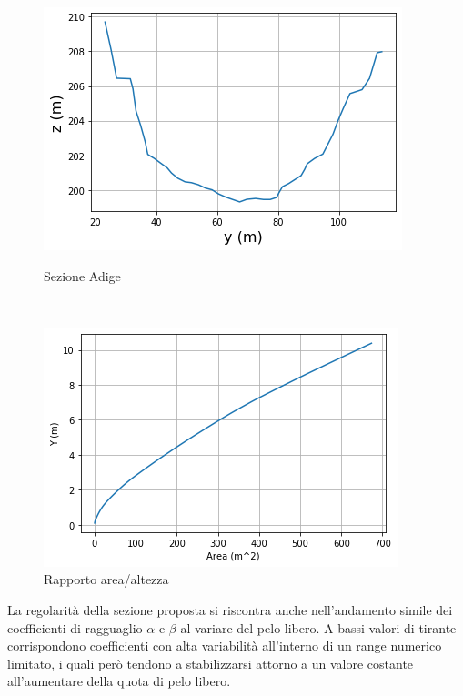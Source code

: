 \documentclass[12pt]{article} %
\begin{document}
\begin{figure}[H]
\begin{minipage}[b]{8.5cm}
\centering
    \includegraphics[width=1 \textwidth]{sezioneadi.png}
    \caption{Sezione Adige}
    \label{fig:Adige_sezione}
\end{minipage}
\ \hspace{2mm} \hspace{3mm} \
\begin{minipage}[b]{8.5cm}
    \centering
    \includegraphics[width=1 \textwidth]{rapporto area altezzaadi.png}
    \caption{Rapporto area/altezza}
    \label{fig:Adige_area/altezza}
\end{minipage}
\end{figure}

\noindent La regolarità della sezione proposta si riscontra anche nell’andamento simile dei coefficienti di ragguaglio $\alpha$ e $\beta$ al variare del pelo libero. A bassi valori di tirante corrispondono coefficienti con alta variabilità all’interno di un range numerico limitato, i quali però tendono a stabilizzarsi attorno a un valore costante all’aumentare della quota di pelo libero.
\end{document}

